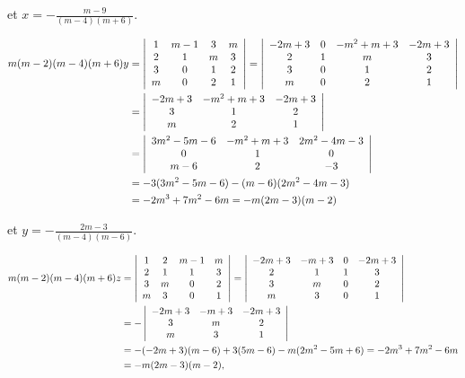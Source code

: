 {\begin{enumerate}
{et $x=-\frac{m-9}{(m-4)(m+6)}$.

\begin{align*}\ensuremath
m(m-2)(m-4)(m+6)y&=\left|
\begin{array}{cccc}
1&m-1&3&m\\
2&1&m&3\\
3&0&1&2\\
m&0&2&1
\end{array}\right|=\left|
\begin{array}{cccc}
-2m+3&0&-m^2+m+3&-2m+3\\
2&1&m&3\\
3&0&1&2\\
m&0&2&1
\end{array}\right|\\
 &=\left|
\begin{array}{ccc}
-2m+3&-m^2+m+3&-2m+3\\
3&1&2\\
m&2&1
\end{array}\right|\\
 &=\left|
\begin{array}{ccc}
3m^2-5m-6&-m^2+m+3&2m^2-4m-3\\
0&1&0\\
m-6&2&-3
\end{array}\right|\\
 &=-3(3m^2-5m-6)-(m-6)(2m^2-4m-3)\\
 &=-2m^3+7m^2-6m=-m(2m-3)(m-2)
\end{align*}

et $y=-\frac{2m-3}{(m-4)(m-6)}$.

\begin{align*}\ensuremath
m(m-2)(m-4)(m+6)z&=\left|
\begin{array}{cccc}
1&2&m-1&m\\
2&1&1&3\\
3&m&0&2\\
m&3&0&1
\end{array}\right|=\left|
\begin{array}{cccc}
-2m+3&-m+3&0&-2m+3\\
2&1&1&3\\
3&m&0&2\\
m&3&0&1
\end{array}\right|\\
 &=-\left|
\begin{array}{ccc}
-2m+3&-m+3&-2m+3\\
3&m&2\\
m&3&1
\end{array}\right|\\
 &=-(-2m+3)(m-6)+3(5m-6)-m(2m^2-5m+6)=-2m^3+7m^2-6m\\
 &=-m(2m-3)(m-2),
\end{align*}

}
\end{enumerate}}
